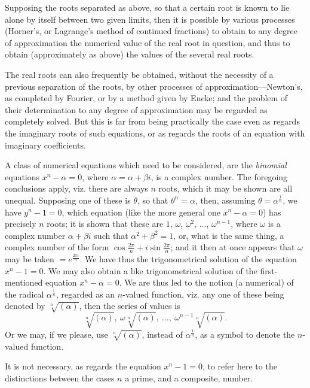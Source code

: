 \documentclass[11pt,a4paper]{book}
\begin{document}
Supposing the roots separated as above, so that a certain root is known to lie alone by itself between two given limits, then it is possible by various processes (Horner's, or Lagrange's method of continued fractions) to obtain to any degree of approximation the numerical value of the real root in question, and thus to obtain (approximately as above) the values of the several real roots.

The real roots can also frequently be obtained, without the necessity of a previous separation of the roots, by other processes of approximation---Newton's, as completed by Fourier, or by a method given by Encke; and the problem of their determination to any degree of approximation may be regarded as completely solved. But this is far from being practically the case even as regards the imaginary roots of such equations, or as regards the roots of an equation with imaginary coefficients.

A class of numerical equations which need to be considered, are the \textit{binomial} equations $x^n - \alpha = 0$, where $\alpha = \alpha + \beta i$, is a complex number. The foregoing conclusions apply, viz. there are always $n$ roots, which it may be shown are all unequal. Supposing one of these is $\theta$, so that $\theta^n = \alpha$, then, assuming $\theta = \alpha^{\frac{1}{n}}$, we have $y^n - 1 = 0$, which equation (like the more general one $x^n - \alpha = 0$) has precisely $n$ roots; it is shown that these are $1$, $\omega$, $\omega^2$, $\ldots$, $\omega^{n-1}$, where $\omega$ is a complex number $\alpha + \beta i$ such that $\alpha^2 + \beta^2 = 1$, or, what is the same thing, a complex number of the form $\cos\frac{2\pi}{n} + i\sin\frac{2\pi}{n}$; and it then at once appears that $\omega$ may be taken $= e^{\frac{2\pi i}{n}}$. We have thus the trigonometrical solution of the equation $x^n - 1 = 0$. We may also obtain a like trigonometrical solution of the first-mentioned equation $x^n - \alpha = 0$. We are thus led to the notion (a numerical) of the radical $\alpha^{\frac{1}{n}}$, regarded as an $n$-valued function, viz. any one of these being denoted by $\sqrt[n]{(\alpha)}$, then the series of values is
\[
\sqrt[n]{(\alpha)},\ \omega\sqrt[n]{(\alpha)},\ \ldots,\ \omega^{n-1}\sqrt[n]{(\alpha)}.
\]
Or we may, if we please, use $\sqrt[n]{(\alpha)}$, instead of $\alpha^{\frac{1}{n}}$, as a symbol to denote the $n$-valued function.

It is not necessary, as regards the equation $x^n - 1 = 0$, to refer here to the distinctions between the cases $n$ a prime, and a composite, number.
\end{document}
